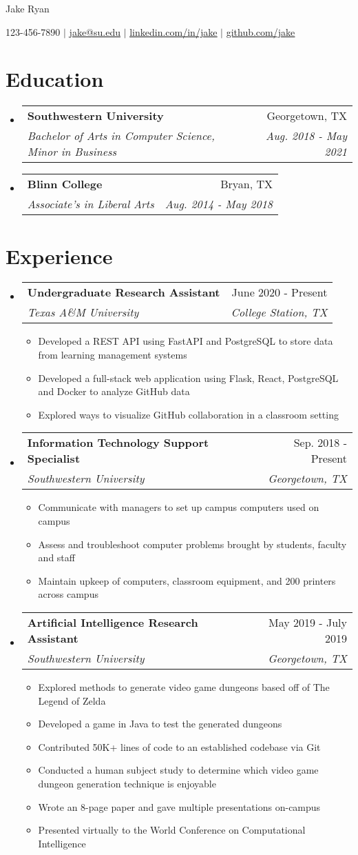 \documentclass[letterpaper,11pt]{article}%
\makeatletter
\newcommand{\resumeItem}[1]{
  \item\small{
    {#1 \vspace{-2pt}}
  }
}
\newcommand{\resumeSubheading}[4]{
  \vspace{-2pt}\item
    \begin{tabular*}{0.97\textwidth}[t]{l@{\extracolsep{\fill}}r}
      \textbf{#1} & #2 \\
      \textit{\small#3} & \textit{\small #4} \\
    \end{tabular*}\vspace{-7pt}
}
\newcommand{\resumeSubHeadingListStart}{\begin{itemize}[leftmargin=0.15in, label={}]}
\newcommand{\resumeSubHeadingListEnd}{\end{itemize}}
\newcommand{\resumeItemListStart}{\begin{itemize}}
\newcommand{\resumeItemListEnd}{\end{itemize}\vspace{-5pt}}
\makeatother
\begin{document}
%
\normalsize%
\begin{center}%
\textbf{\Huge \scshape }{Jake Ryan}%
\linebreak%
\vspace{1pt}%
\linebreak%
\begin{small}%
123{-}456{-}7890 $|$ \href{mailto:jake@su.edu}{\underline{jake@su.edu}} $|$ \href{https://linkedin.com/in/jake}{\underline{linkedin.com/in/jake}} $|$ \href{https://github.com/jake}{\underline{github.com/jake}}%
\end{small}%
\end{center}%
\section*{Education}%
\label{sec:Education}%
\resumeSubHeadingListStart%
\resumeSubheading{Southwestern University}{Georgetown, TX}{Bachelor of Arts in Computer Science, Minor in Business}{Aug. 2018 {-} May 2021}%
\resumeSubheading{Blinn College}{Bryan, TX}{Associate's in Liberal Arts}{Aug. 2014 {-} May 2018}%
\resumeSubHeadingListEnd

%
\section*{Experience}%
\label{sec:Experience}%
\resumeSubHeadingListStart%
\resumeSubheading{Undergraduate Research Assistant}{June 2020 {-} Present}{Texas A\&M University}{College Station, TX}%
\resumeItemListStart%
\resumeItem{Developed a REST API using FastAPI and PostgreSQL to store data from learning management systems}%
\resumeItem{Developed a full{-}stack web application using Flask, React, PostgreSQL and Docker to analyze GitHub data}%
\resumeItem{Explored ways to visualize GitHub collaboration in a classroom setting}%
\resumeItemListEnd%
\resumeSubheading{Information Technology Support Specialist}{Sep. 2018 {-} Present}{Southwestern University}{Georgetown, TX}%
\resumeItemListStart%
\resumeItem{Communicate with managers to set up campus computers used on campus}%
\resumeItem{Assess and troubleshoot computer problems brought by students, faculty and staff}%
\resumeItem{Maintain upkeep of computers, classroom equipment, and 200 printers across campus}%
\resumeItemListEnd%
\resumeSubheading{Artificial Intelligence Research Assistant}{May 2019 {-} July 2019}{Southwestern University}{Georgetown, TX}%
\resumeItemListStart%
\resumeItem{Explored methods to generate video game dungeons based off of The Legend of Zelda}%
\resumeItem{Developed a game in Java to test the generated dungeons}%
\resumeItem{Contributed 50K+ lines of code to an established codebase via Git}%
\resumeItem{Conducted a human subject study to determine which video game dungeon generation technique is enjoyable}%
\resumeItem{Wrote an 8{-}page paper and gave multiple presentations on{-}campus}%
\resumeItem{Presented virtually to the World Conference on Computational Intelligence}%
\resumeItemListEnd%
\resumeSubHeadingListEnd
\end{document}
